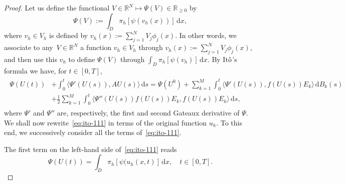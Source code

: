 \documentclass[12pt]{article}
\newcommand{\dd}{\,\mathrm{d}}
\begin{document}
{\begin{proof}
    Let us define the functional  $V \in \mathbb{R}^N \mapsto \Psi(V) \in \mathbb{R}_{\geq 0}$ by
%
\[ \Psi(V):= \int_D \pi_h [\psi(v_h(x))]\dd x, \]
%
where $v_h \in V_h$ is defined by $v_h(x):= \sum_{j=1}^N V_j \phi_j(x)$. In other words, we associate to any~$V \in \mathbb{R}^N$ a function $v_h \in V_h$ through $v_h(x):= \sum_{j=1}^N V_j \phi_j(x)$, and then use this $v_h$ to define $\Psi(V)$ through $\int_D \pi_h[\psi(v_h)] \dd x$.
By It$\hat{\rm{o}}$'s formula we have, for $t \in [0,T]$,
%
\begin{align}
\begin{aligned}
\label{eq:ito-111}
 \Psi(U(t)) &+ \int_0^t \langle \Psi'(U(s)), AU(s) \rangle \dd s 
 = \Psi(U^0) + \sum_{k=1}^M \int_0^t \langle \Psi'(U(s)), f(U(s))E_k\rangle \dd B_k(s)\\ &+ \frac{1}{2}\sum_{k=1}^M \int_0^t \langle \Psi''(U(s))f(U(s))E_k, f(U(s))E_k \rangle \dd s, 
\end{aligned}
\end{align}
%
where $\Psi'$ and $\Psi''$ are, respectively, the first and second Gateaux derivative of $\Psi$.
We shall now rewrite~\eqref{eq:ito-111} in terms of the original function $u_h$. To this end, we successively consider all the terms of~\eqref{eq:ito-111}.
 
   
 
The first term on the left-hand side of~\eqref{eq:ito-111} reads 
%
\begin{equation}
\label{eq:first-left}
\Psi(U(t)) = \int_D \pi_h[\psi(u_h(x,t)] \dd x, \quad t \in [0,T].
\end{equation}
%


\end{proof}}
\end{document}
